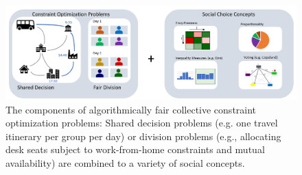 \documentclass[german, a4paper, 11pt, oneside]{scrbook}
\begin{document}
\begin{figure}[h]
    \centering
    \includegraphics[width=\textwidth]{concepts}
    \caption{The components of algorithmically fair collective constraint optimization problems: Shared decision problems (e.g. one travel itinerary per group per day) or division problems (e.g., allocating desk seats subject to work-from-home constraints and mutual availability) are combined to a variety of social concepts.}
    \label{fig:overview}
\end{figure}
\end{document}
